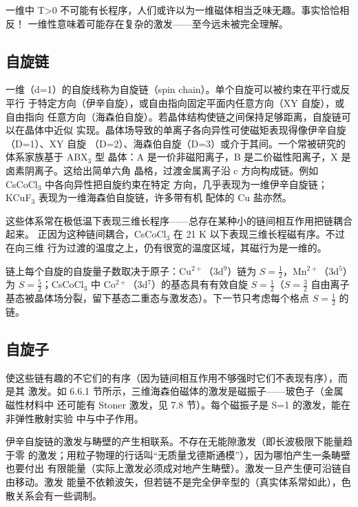 一维中 T>0 不可能有长程序，人们或许以为一维磁体相当乏味无趣。事实恰恰相反！
一维性意味着可能存在复杂的激发——至今远未被完全理解。

\subsection{自旋链}

一维（d=1）的自旋线称为自旋链（spin chain）。单个自旋可以被约束在平行或反平行
于特定方向（伊辛自旋），或自由指向固定平面内任意方向（XY 自旋），或自由指向
任意方向（海森伯自旋）。若晶体结构使链之间保持足够距离，自旋链可以在晶体中近似
实现。晶体场导致的单离子各向异性可使磁矩表现得像伊辛自旋（D=1）、XY 自旋
（D=2）、海森伯自旋（D=3）或介于其间。一个常被研究的体系家族基于 ABX$_3$ 型
晶体：A 是一价非磁阳离子，B 是二价磁性阳离子，X 是卤素阴离子。这给出简单六角
晶格，过渡金属离子沿 c 方向构成链。例如 CsCoCl$_3$ 中各向异性把自旋约束在特定
方向，几乎表现为一维伊辛自旋链；KCuF$_3$ 表现为一维海森伯自旋链，许多带有机
配体的 Cu 盐亦然。

这些体系常在极低温下表现三维长程序——总存在某种小的链间相互作用把链耦合起来。
正因为这种链间耦合，CsCoCl$_3$ 在 21 K 以下表现三维长程磁有序。不过在向三维
行为过渡的温度之上，仍有很宽的温度区域，其磁行为是一维的。

链上每个自旋的自旋量子数取决于原子：$\mathrm{Cu^{2+}}$（3d$^9$）链为
$S=\frac{1}{2}$，$\mathrm{Mn^{2+}}$（3d$^5$）为 $S=\frac{5}{2}$；CsCoCl$_3$ 中
$\mathrm{Co^{2+}}$（3d$^7$）的基态具有有效自旋 $S=\frac{1}{2}$（$S=\frac{3}{2}$
自由离子基态被晶体场分裂，留下基态二重态与激发态）。下一节只考虑每个格点
$S=\frac{1}{2}$ 的链。

\subsection{自旋子}

使这些链有趣的不它们的有序（因为链间相互作用不够强时它们不表现有序），而是其
激发。如 6.6.1 节所示，三维海森伯磁体的激发是磁振子——玻色子（金属磁性材料中
还可能有 Stoner 激发，见 7.8 节）。每个磁振子是 S=1 的激发，能在非弹性散射实验
中与中子作用。

伊辛自旋链的激发与畴壁的产生相联系。不存在无能隙激发（即长波极限下能量趋于零
的激发；用粒子物理的行话叫“无质量戈德斯通模”），因为哪怕产生一条畴壁也要付出
有限能量（实际上激发必须成对地产生畴壁）。激发一旦产生便可沿链自由移动。激发
能量不依赖波矢，但若链不是完全伊辛型的（真实体系常如此），色散关系会有一些调制。

